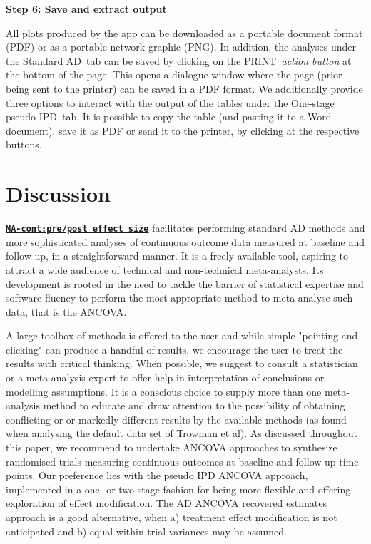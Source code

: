 \documentclass[AMA,STIX1COL]{WileyNJD-v2}
\begin{document}
\vspace{0.1cm}

\textbf{Step 6: Save and extract output}
\vspace{0.1cm}

All plots produced by the app can be downloaded as a portable document format (PDF) or as a portable network graphic (PNG). In addition, the analyses under the \textquotesingle Standard AD\textquotesingle\ tab can be saved by clicking on the \textquotesingle PRINT\textquotesingle\ \textit{action button} at the bottom of the page. This opens a dialogue window where the page (prior being sent to the printer) can be saved in a PDF format. We additionally provide three options to interact with the output of the tables under the \textquotesingle One-stage pseudo IPD\textquotesingle\ tab. It is possible to copy the table (and pasting it to a Word document), save it as PDF or send it to the printer, by clicking at the respective buttons. 

\section{Discussion}

\href{https://katerina-pap.shinyapps.io/MA-cont-prepostES/}{\textbf{\texttt{MA-cont:pre/post effect size}}} facilitates performing standard AD methods and more sophisticated analyses of continuous outcome data measured at baseline and follow-up, in a straightforward manner. It is a freely available tool, aspiring to attract a wide audience of technical and non-technical meta-analysts. Its development is rooted in the need to tackle the barrier of statistical expertise and software fluency to perform the most appropriate method to meta-analyse such data, that is the ANCOVA.

A large toolbox of methods is offered to the user and while simple "pointing and clicking" can produce a handful of results, we encourage the user to treat the results with critical thinking. When possible, we suggest to consult a statistician or a meta-analysis expert to offer help in interpretation of conclusions or modelling assumptions. It is a conscious choice to supply more than one meta-analysis method to educate and draw attention to the possibility of obtaining conflicting or
or markedly different results by the available methods (as found when analysing the default data set of Trowman et al\cite{trowman2007impact}). As discussed throughout this paper, we recommend to undertake ANCOVA approaches to synthesize randomised trials measuring continuous outcomes at baseline and follow-up time points. Our preference lies with the pseudo IPD ANCOVA approach, implemented in a one- or two-stage fashion for being more flexible and offering exploration of effect modification. The AD ANCOVA recovered estimates approach is a good alternative, when a) treatment effect modification is not anticipated and b) equal within-trial variances may be assumed.
\end{document}
